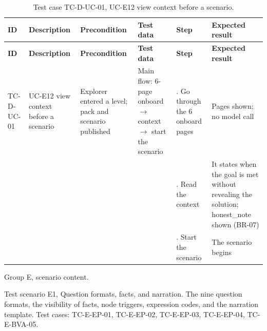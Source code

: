 {\footnotesize{}\renewcommand{\arraystretch}{1.1}
\begin{longtable}{|>{\raggedright\arraybackslash}p{}|>{\raggedright\arraybackslash}p{}|>{\raggedright\arraybackslash}p{}|>{\raggedright\arraybackslash}p{}|>{\raggedright\arraybackslash}p{}|>{\raggedright\arraybackslash}p{}|}
\caption{Test case TC-D-UC-01, UC-E12 view context before a scenario.} \\
\hline
\textbf{ID} & \textbf{Description} & \textbf{Precondition} & \textbf{Test data} & \textbf{Step} & \textbf{Expected result} \\ \hline
\endfirsthead
\hline
\textbf{ID} & \textbf{Description} & \textbf{Precondition} & \textbf{Test data} & \textbf{Step} & \textbf{Expected result} \\ \hline
\endhead
TC-D-UC-01 & UC-E12 view context before a scenario & Explorer entered a level; pack and scenario published & Main flow: 6-page onboard $\rightarrow$ context $\rightarrow$ start the scenario & 1. Go through the 6 onboard pages & Pages shown; no model call \\ \cline{5-6}
 &  &  &  & 2. Read the context & It states when the goal is met without revealing the solution; honest\_note shown (BR-07) \\ \cline{5-6}
 &  &  &  & 3. Start the scenario & The scenario begins \\ \hline
\end{longtable}
}

Group E, scenario content.

Test scenario E1, Question formats, facts, and narration. The nine question formats, the visibility of facts, node triggers, expression codes, and the narration template. Test cases: TC-E-EP-01, TC-E-EP-02, TC-E-EP-03, TC-E-EP-04, TC-\allowbreak{}E-\allowbreak{}BVA-\allowbreak{}05.

